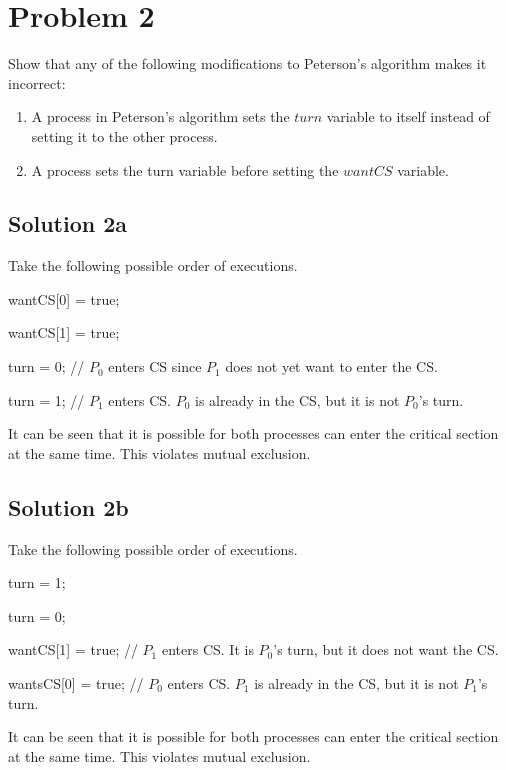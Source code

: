 \documentclass{article}
\begin{document}
\pagebreak
\section{Problem 2}
Show that any of the following modifications to Peterson’s algorithm makes it incorrect:

\begin{enumerate}[label=\alph*)]
  \item A process in Peterson’s algorithm sets the $turn$ variable to itself instead of setting it to the other process.
  \item A process sets the turn variable before setting the $wantCS$ variable.
\end{enumerate}


\subsection{Solution 2a}
Take the following possible order of executions.

\begin{linenumbers}
	wantCS[0] = true;
	
	wantCS[1] = true;
	
	turn = 0; // $P_0$ enters CS since $P_1$ does not yet want to enter the CS.
	
	turn = 1; // $P_1$ enters CS. $P_0$ is already in the CS, but it is not $P_0$'s turn.
\end{linenumbers}

It can be seen that it is possible for both processes can enter the critical section at the same time. This violates mutual exclusion.

\subsection{Solution 2b}
Take the following possible order of executions.

\begin{linenumbers}
	turn = 1;
	
	turn = 0;
	
	wantCS[1] = true; // $P_1$ enters CS. It is $P_0$'s turn, but it does not want the CS.
	
	wantsCS[0] = true; // $P_0$ enters CS. $P_1$ is already in the CS, but it is not $P_1$'s turn.
\end{linenumbers}

It can be seen that it is possible for both processes can enter the critical section at the same time. This violates mutual exclusion.
\end{document}

